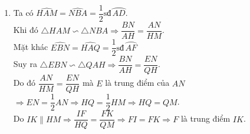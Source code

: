 \begin{ex}
{\begin{enumerate}
\begin{enumerate}
Ta lại có $\widehat{AEF} = \widehat{AHF}$ (do $AEFH$ là tứ giác nội tiếp)\\
mà $\widehat{BQF} = \widehat{AHF}$ (cùng phụ góc $\widehat{HAQ}$)\\
và $\widehat{BEP} = \widehat{AEF}$ (đối đỉnh)\\
nên $\widehat{BEP} = \widehat{BQF} \Rightarrow \triangle BEP \backsim \triangle BQF$.\\
Do đó $\dfrac{BE}{BQ} = \dfrac{BP}{BF} \Rightarrow BE \cdot BF = BP \cdot BQ$.\\
Vậy $BH^2=BP \cdot BQ$.
\end{enumerate}
\item Ta có $\widehat{HAM} = \widehat{NBA} = \dfrac{1}{2} \text{sđ}\,\wideparen{AD}$.\\
Khi đó $\triangle HAM \backsim \triangle NBA \Rightarrow \dfrac{BN}{AH} = \dfrac{AN}{HM}$.\\
Mặt khác $\widehat{EBN} = \widehat{HAQ} = \dfrac{1}{2}\text{sđ}\,\wideparen{AF}$\\
Suy ra $\triangle EBN \backsim \triangle QAH \Rightarrow \dfrac{BN}{AH} = \dfrac{EN}{QH}$.\\
Do đó $\dfrac{AN}{HM} = \dfrac{EN}{QH}$ mà $E$ là trung điểm của $AN$\\
$\Rightarrow EN = \dfrac{1}{2}AN \Rightarrow HQ = \dfrac{1}{2}HM \Rightarrow HQ = QM$.\\
Do $IK \parallel HM \Rightarrow \dfrac{IF}{HQ} = \dfrac{FK}{QM} \Rightarrow FI = FK \Rightarrow F$ là trung điểm $IK$.
\end{enumerate}
}
\end{ex}


